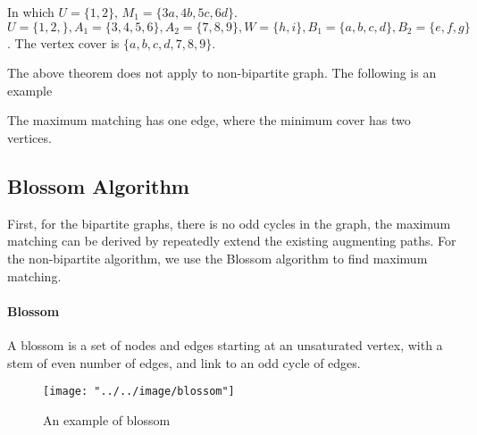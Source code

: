             In which $U = \{1, 2\}$, $M_1 = \{3a, 4b, 5c, 6d\}$. $U = \{1, 2,\}, A_1 = \{3, 4, 5, 6\}, A_2 = \{7, 8, 9\}, W=\{h, i\}, B_1 = \{a, b, c, d\}, B_2 = \{e, f, g\}$. The vertex cover is $\{a, b, c, d, 7, 8, 9\}$.

            The above theorem does not apply to non-bipartite graph. The following is an example
            \begin{figure}[H]
                \centering
            \end{figure}

            The maximum matching has one edge, where the minimum cover has two vertices.

        \subsection{Blossom Algorithm}
            First, for the bipartite graphs, there is no odd cycles in the graph, the maximum matching can be derived by repeatedly extend the existing augmenting paths. For the non-bipartite algorithm, we use the Blossom algorithm to find maximum matching.

            \paragraph{Blossom}
            A blossom is a set of nodes and edges starting at an unsaturated vertex, with a stem of even number of edges, and link to an odd cycle of edges. 

            \begin{figure}[H]
                \centering
                \texttt{[image: "../../image/blossom"]}
                \caption{An example of blossom}
            \end{figure}

